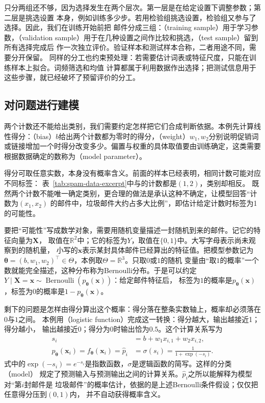 只分两组还不够，因为选择发生在两个层次。第一层是在给定设置下调整参数；第二层是挑选设置
本身，例如训练多少步。若用检验组挑选设置，检验组又参与了选择。因此，我们在训练开始前把
邮件分成三组：（training sample）用于学习参数，（validation
sample）用于在几种设置之间作比较和挑选，（test sample）留到所有选择完成后
作一次独立评价。验证样本和测试样本合称，二者用途不同，需要分开保留。
同样的分工也约束预处理：若需要估计词表或特征尺度，只能在训练样本上拟合。词频筛选和均值
计算都属于利用数据作出选择；把测试信息用于这些步骤，就已经破坏了预留评价的分工。

\subsection{对问题进行建模}

两个计数还不能给出类别，我们需要约定怎样把它们合成判断依据。本例先计算线性得分：（bias）$b$给出两个计数都为零时的得分，（weight）$w_1,w_2$分别说明促销词或链接增加一个时得分改变多少。偏置与权重的具体取值要由训练确定，这类需要根据数据确定的数称为（model parameter）。

得分可取任意实数，本身没有概率含义。前面的样本已经表明，相同计数可能对应不同标签：
表~\ref{tab:spam-data-excerpt}中与的计数都是$(1,2)$，类别却相反。
既然两个计数不能唯一确定类别，更合理的做法是承认这种不确定，让模型回答“计数为$(x_1,x_2)$
的邮件中，垃圾邮件大约占多大比例”，即估计给定计数时标签为1的可能性。

要把“可能性”写成数学对象，需要用随机变量描述一封随机到来的邮件。记它的特征向量为$\bm{X}$，
取值在$\mathbb{R}^2$中；它的标签为$Y$，取值在$\{0,1\}$中。大写字母表示尚未观察到的随机量，
小写的$\bm{x}$表示某封具体邮件已经算出的特征值。把模型参数记为
$\bm{\theta}=(b,w_1,w_2)^{\top}\in\Theta$，本例取$\Theta=\mathbb{R}^3$。只取$0$或$1$的随机
变量由“取$1$的概率”一个数就能完全描述，这种分布称为Bernoulli分布。于是可以约定
$Y\mid\bm{X}=\bm{x}\sim\operatorname{Bernoulli}(p_{\bm{\theta}}(\bm{x}))$：给定邮件特征后，
标签为$1$的概率是$p_{\bm{\theta}}(\bm{x})$，标签为$0$的概率是$1-p_{\bm{\theta}}(\bm{x})$。

剩下的问题是怎样由得分算出这个概率：得分落在整条实数轴上，概率却必须落在$0$与$1$之间。
本例用（logistic function）完成这一转换：得分越大，输出越接近1；得分越小，
输出越接近0；得分为$0$时输出恰为$0.5$。这个计算关系写为
\begin{align}
  s_i &= b+w_1x_{i,1}+w_2x_{i,2}, \\
  p_{\bm{\theta}}(\bm{x}_i)
  =f_{\bm{\theta}}(\bm{x}_i)
  =\hat{p}_i
  &=\sigma(s_i)=\frac{1}{1+\exp(-s_i)}.
  \label{eq:spam-model}
\end{align}
式中的$\exp(-s_i)=e^{-s_i}$是指数函数，$\sigma$是逻辑函数的简写。这样的分类（model）
规定了预测输入与预测输出之间的计算关系。$\hat{p}_i$之所以能解释为模型对“第$i$封邮件是
垃圾邮件”的概率估计，依据的是上述Bernoulli条件假设；仅仅把任意得分压到$(0,1)$内，
并不自动获得概率含义。

